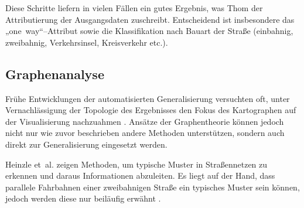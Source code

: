 \documentclass[../main/thesis.tex]{subfiles}
\begin{document}
Diese Schritte liefern in vielen Fällen ein gutes Ergebnis, was Thom der Attributierung der Ausgangsdaten zuschreibt. Entscheidend ist insbesondere das „one~way“–Attribut sowie die Klassifikation nach Bauart der Straße (einbahnig, zweibahnig, Verkehrsinsel, Kreisverkehr etc.). 


\subsection{Graphenanalyse}



Frühe Entwicklungen der automatisierten Generalisierung versuchten oft, unter Vernachlässigung der Topologie des Ergebnisses den Fokus des Kartographen auf der Visualisierung nachzuahmen . Ansätze der Graphentheorie können jedoch nicht nur wie zuvor beschrieben andere Methoden unterstützen, sondern auch direkt zur Generalisierung eingesetzt werden.


Heinzle et~al. zeigen Methoden, um typische Muster in Straßennetzen zu erkennen und daraus Informationen abzuleiten. 
Es liegt auf der Hand, dass parallele Fahrbahnen einer zweibahnigen Straße ein typisches Muster sein können, jedoch werden diese nur beiläufig erwähnt .

\end{document}
